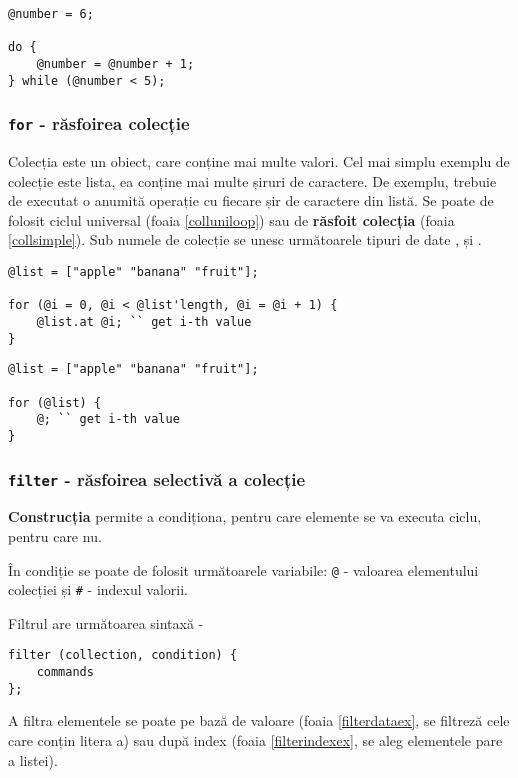 \begin{lstlisting}[caption=Ciclu do while, label=dowhileex]
@number = 6;

do {
	@number = @number + 1;
} while (@number < 5);
\end{lstlisting}

\subsubsection{\lstinline|for| - răsfoirea colecție}

{Colecția} este un obiect, care conține mai multe valori. Cel mai simplu exemplu de colecție este lista, ea conține mai multe șiruri de caractere. De exemplu, trebuie de executat o anumită operație cu fiecare șir de caractere din listă. Se poate de folosit ciclul universal (foaia \ref{colluniloop}) sau de {\bf răsfoit colecția} (foaia \ref{collsimple}). Sub numele de colecție se unesc următoarele tipuri de date ,  și .
\begin{lstlisting}[caption=Răsfoirea colecție prin ciclu universal, label=colluniloop]
@list = ["apple" "banana" "fruit"];

for (@i = 0, @i < @list'length, @i = @i + 1) {
	@list.at @i; `` get i-th value
}
\end{lstlisting}

\begin{lstlisting}[caption=Răsfoirea simplificată a colecției, label=collsimple]
@list = ["apple" "banana" "fruit"];

for (@list) {
	@; `` get i-th value
}
\end{lstlisting}

\subsubsection{\lstinline|filter| - răsfoirea selectivă a colecție}

{\bf Construcția } permite a condiționa, pentru care elemente se va executa ciclu, pentru care nu.

În condiție se poate de folosit următoarele variabile: \lstinline|@| - valoarea elementului colecției și \lstinline|#| - indexul valorii.

Filtrul are următoarea sintaxă -
\begin{lstlisting}[numbers=none]
filter (collection, condition) {
	commands
};
\end{lstlisting}

A filtra elementele se poate pe bază de valoare (foaia \ref{filterdataex}, se filtreză cele care conțin litera a) sau după index (foaia \ref{filterindexex}, se aleg elementele pare a listei).


